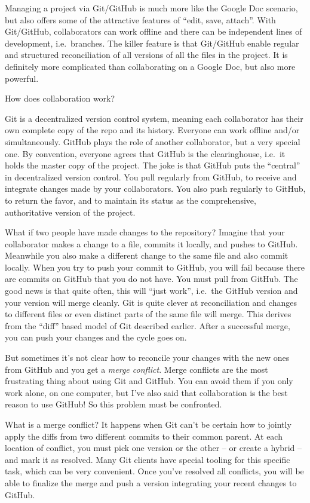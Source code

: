 \documentclass[12pt]{article}
\begin{document}
Managing a project via Git/GitHub is much more like the Google Doc
scenario, but also offers some of the attractive features of ``edit,
save, attach''. With Git/GitHub, collaborators can work offline and
there can be independent lines of development, i.e.~branches. The killer
feature is that Git/GitHub enable regular and structured reconciliation
of all versions of all the files in the project. It is definitely more
complicated than collaborating on a Google Doc, but also more powerful.

How does collaboration work?

Git is a decentralized version control system, meaning each collaborator
has their own complete copy of the repo and its history. Everyone can
work offline and/or simultaneously. GitHub plays the role of another
collaborator, but a very special one. By convention, everyone agrees
that GitHub is the clearinghouse, i.e.~it holds the master copy of the
project. The joke is that GitHub puts the ``central'' in decentralized
version control. You pull regularly from GitHub, to receive and
integrate changes made by your collaborators. You also push regularly to
GitHub, to return the favor, and to maintain its status as the
comprehensive, authoritative version of the project.

What if two people have made changes to the repository? Imagine that
your collaborator makes a change to a file, commits it locally, and
pushes to GitHub. Meanwhile you also make a different change to the same
file and also commit locally. When you try to push your commit to
GitHub, you will fail because there are commits on GitHub that you do
not have. You must pull from GitHub. The good news is that quite often,
this will ``just work'', i.e.~the GitHub version and your version will
merge cleanly. Git is quite clever at reconciliation and changes to
different files or even distinct parts of the same file will merge. This
derives from the ``diff'' based model of Git described earlier. After a
successful merge, you can push your changes and the cycle goes on.

But sometimes it's not clear how to reconcile your changes with the new
ones from GitHub and you get a \emph{merge conflict}. Merge conflicts
are the most frustrating thing about using Git and GitHub. You can avoid
them if you only work alone, on one computer, but I've also said that
collaboration is the best reason to use GitHub! So this problem must be
confronted.

What is a merge conflict? It happens when Git can't be certain how to
jointly apply the diffs from two different commits to their common
parent. At each location of conflict, you must pick one version or the
other -- or create a hybrid -- and mark it as resolved. Many Git clients
have special tooling for this specific task, which can be very
convenient. Once you've resolved all conflicts, you will be able to
finalize the merge and push a version integrating your recent changes to
GitHub.
\end{document}
